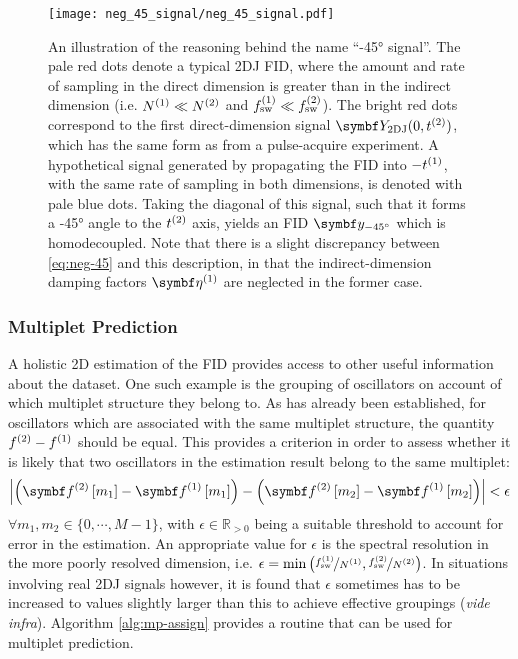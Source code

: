 \begin{figure}
    \centering
    \texttt{[image: neg\_45\_signal/neg\_45\_signal.pdf]}
    \caption[
        An illustration of the reasoning behind the name ``\ang{-45}
        signal''.
    ]{
        An illustration of the reasoning behind the name ``\ang{-45}
        signal''. The pale red dots denote a typical \ac{2DJ} \ac{FID}, where
        the amount and rate of sampling in the direct dimension is greater than
        in the indirect dimension (i.e. $N^{(1)} \ll N^{(2)}$ and $f_{\mathrm{sw}}^{(1)} \ll
        f_{\mathrm{sw}}^{(2)}$). The bright red dots correspond to the first direct-dimension
        signal $\bY_{\text{2DJ}}(0, \ttwo)$, which has the same form as
         from a pulse-acquire experiment. A hypothetical signal
        generated by propagating the \ac{FID} into $-t^{(1)}$, with the same rate
        of sampling in both dimensions, is denoted with pale blue dots. Taking
        the diagonal of this signal, such that it forms a \ang{-45} angle to the
        $t^{(2)}$ axis, yields an \ac{FID} $\by_{\ang{-45}}$  which is
        homodecoupled. Note that there is a slight discrepancy
        between \eqref{eq:neg-45} and this description, in that the
        indirect-dimension damping factors $\bdetaone$ are neglected in the
        former case.
    }
    \label{fig:neg-45}
\end{figure}

\subsubsection{Multiplet Prediction}
A holistic \ac{2D} estimation of the \ac{FID} provides access to other useful
information about the dataset. One such example is the grouping of oscillators
on account of which multiplet structure they belong to. As has already been
established, for oscillators which are associated with the same multiplet
structure, the quantity $f^{(2)} - f^{(1)}$ should be equal. This provides a
criterion in order to assess whether it is likely that two oscillators in the
estimation result belong to the same multiplet:
\begin{equation}
    \left \lvert
        \left( \bdftwo \left[ m_1 \right] -
        \bdfone \left[ m_1 \right] \right) -
        \left( \bdftwo \left[ m_2 \right] -
        \bdfone \left[ m_2 \right] \right)
    \right \rvert < \epsilon
\end{equation}
$\forall m_1, m_2 \in \lbrace 0, \cdots, M-1 \rbrace$, with  $\epsilon \in
\mathbb{R}_{>0}$ being a suitable threshold to account for error in the
estimation. An appropriate value for $\epsilon$ is the
spectral resolution in the more poorly resolved dimension, i.e.
$\epsilon = \min\left(\nicefrac{f_{\mathrm{sw}}^{(1)}}{N^{(1)}}, \nicefrac{f_{\mathrm{sw}}^{(2)}}{N^{(2)}}\right)$. In situations involving real \ac{2DJ}
signals however, it is found that $\epsilon$ sometimes has to be increased to
values slightly larger than this to achieve effective groupings (\textit{vide
infra}). Algorithm \ref{alg:mp-assign} provides a routine that can be used for
multiplet prediction.

